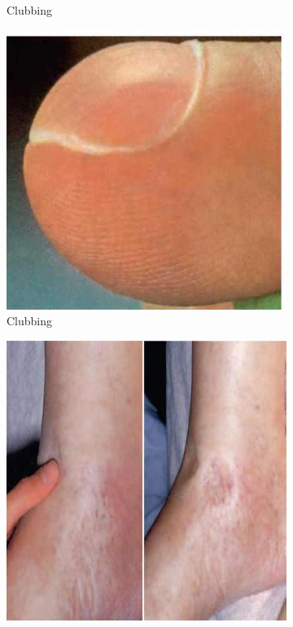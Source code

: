 \documentclass[a4paper,12pt,openany,twoside]{book}
\begin{document}
{\begin{figure}[h]
\begin{subfigure}[t]{.23\textwidth}
																	\caption{Clubbing}
																	\label{Clubbing2}
																\end{subfigure}
																\hspace{\fill}
																\begin{subfigure}[t]{.23\textwidth}
																	\centering
																	\includegraphics[width=\textwidth]{./clinicalPhysioPic/clubbing3-2.jpg}
																	\caption{Clubbing}
																	\label{Clubbing3}
																\end{subfigure}
																\hspace{\fill}
																\begin{subfigure}[t]{.23\textwidth}
																	\centering
																	\includegraphics[width=\textwidth]{./clinicalPhysioPic/pittingPedalEdema.jpg}

\end{subfigure}
\end{figure}}
\end{document}

